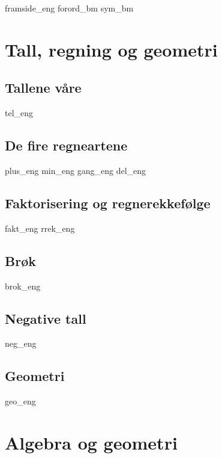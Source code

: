 




{framside_eng}
{forord_bm}
{sym_bm}
\newpage

{\footnotesize \tableofcontents}
\newpage
\part{Tall, regning og geometri}

\chapter{Tallene våre \label{Talavare}}
\newpage
{tel_eng}
%
\chapter{De fire regneartene \label{Rekneartane}}
\newpage
{plus_eng}
{min_eng}
{gang_eng}
{del_eng}
\chapter{Faktorisering og regnerekkefølge}
\newpage
{fakt_eng}
{rrek_eng}

\chapter{Brøk}
\newpage
{brok_eng}

\chapter{Negative tall \label{Negtal}}
\newpage
{neg_eng}


\chapter{Geometri}
\newpage
{geo_eng}

\part{Algebra og geometri \label{Del2}}
